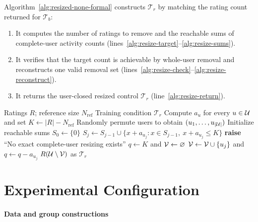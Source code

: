 \documentclass[11pt]{article}
\begin{document}
Algorithm~\ref{alg:resized-none-formal} constructs $\mathcal T_r$ by matching
the rating count returned for $\mathcal T_b$:
\begin{enumerate}
    \item It computes the number of ratings to remove and the reachable sums
    of complete-user activity counts (lines~\ref{alg:resize-target}--\ref{alg:resize-sums}).
    \item It verifies that the target count is achievable by whole-user
    removal and reconstructs one valid removal set
    (lines~\ref{alg:resize-check}--\ref{alg:resize-reconstruct}).
    \item It returns the user-closed resized control $\mathcal T_r$
    (line~\ref{alg:resize-return}).
\end{enumerate}

\begin{algorithm}[H]
\caption{Exact whole-user resizing without balancing}
\label{alg:resized-none-formal}
\begin{algorithmic}[1]
\Require Ratings $R$; reference size $N_{\mathrm{ref}}$
\Ensure Training condition $\mathcal T_r$
\State Compute $a_u$ for every $u\in{\cal U}$ and set $K\gets|R|-N_{\mathrm{ref}}$
    \label{alg:resize-target}
\State Randomly permute users to obtain $(u_1,\ldots,u_{|{\cal U}|})$
\State Initialize reachable sums $S_0\gets\{0\}$
    \State $S_j\gets S_{j-1}\cup\{x+a_{u_j}:x\in S_{j-1},\ x+a_{u_j}\leq K\}$
        \label{alg:resize-sums}
\EndFor
{}
    \State \textbf{raise} ``No exact complete-user resizing exists''
        \label{alg:resize-check}
\EndIf
\State $q\gets K$ and ${\cal V}\gets\varnothing$
        \State ${\cal V}\gets{\cal V}\cup\{u_j\}$ and $q\gets q-a_{u_j}$
            \label{alg:resize-reconstruct}
    \EndIf
\EndFor
\State \Return $R({\cal U}\setminus{\cal V})$ as $\mathcal T_r$
    \label{alg:resize-return}
\end{algorithmic}
\end{algorithm}

\section{Experimental Configuration}
\label{sec:configuration}

\paragraph{Data and group constructions}
\end{document}
